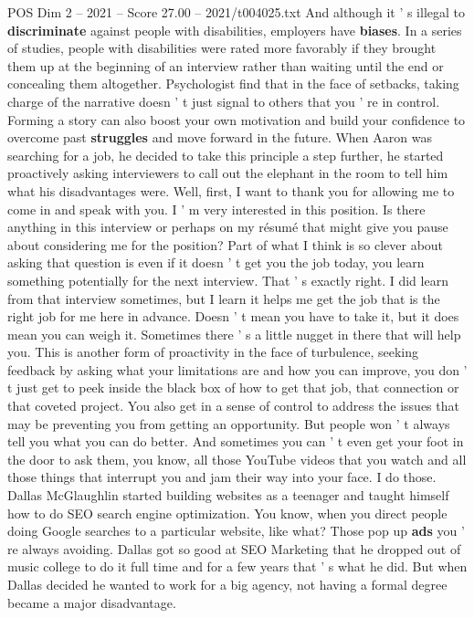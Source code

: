 \begin{textsample}{POS Dim 2 – 2021 – Score 27.00 – 2021/t004025.txt}
And although it ' s illegal to \textbf{discriminate} against people with disabilities, employers have \textbf{biases}.
In a series of studies, people with disabilities were rated more favorably if they brought them up at the beginning of an interview rather than waiting until the end or concealing them altogether.
Psychologist find that in the face of setbacks, taking charge of the narrative doesn ' t just signal to others that you ' re in control.
Forming a story can also boost your own motivation and build your confidence to overcome past \textbf{struggles} and move forward in the future.
When Aaron was searching for a job, he decided to take this principle a step further, he started proactively asking interviewers to call out the elephant in the room to tell him what his disadvantages were.
Well, first, I want to thank you for allowing me to come in and speak with you.
I ' m very interested in this position.
Is there anything in this interview or perhaps on my résumé that might give you pause about considering me for the position?
Part of what I think is so clever about asking that question is even if it doesn ' t get you the job today, you learn something potentially for the next interview.
That ' s exactly right.
I did learn from that interview sometimes, but I learn it helps me get the job that is the right job for me here in advance.
Doesn ' t mean you have to take it, but it does mean you can weigh it.
Sometimes there ' s a little nugget in there that will help you.
This is another form of proactivity in the face of turbulence, seeking feedback by asking what your limitations are and how you can improve, you don ' t just get to peek inside the black box of how to get that job, that connection or that coveted project.
You also get in a sense of control to address the issues that may be preventing you from getting an opportunity.
But people won ' t always tell you what you can do better.
And sometimes you can ' t even get your foot in the door to ask them, you know, all those YouTube videos that you watch and all those things that interrupt you and jam their way into your face.
I do those.
Dallas McGlaughlin started building websites as a teenager and taught himself how to do SEO search engine optimization.
You know, when you direct people doing Google searches to a particular website, like what?
Those pop up \textbf{ads} you ' re always avoiding.
Dallas got so good at SEO Marketing that he dropped out of music college to do it full time and for a few years that ' s what he did.
But when Dallas decided he wanted to work for a big agency, not having a formal degree became a major disadvantage.

\end{textsample}
